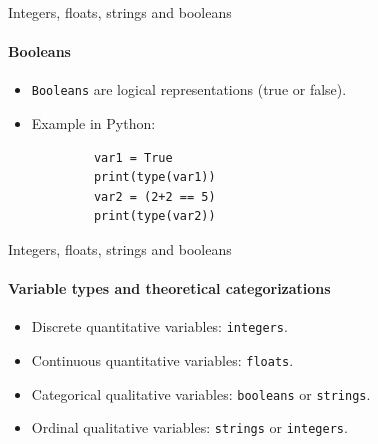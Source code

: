 \documentclass[notes,11pt, aspectratio=169, xcolor=table]{beamer}
\begin{document}
    \begin{frame}[fragile=singleslide]{Integers, floats, strings and booleans}
    \framesubtitle{Booleans}

        \begin{itemize}
            \item \texttt{Booleans} are logical representations (true or false).
            \item Example in Python:
        \end{itemize}

        \begin{verbatim}
            var1 = True
            print(type(var1))
            var2 = (2+2 == 5)
            print(type(var2))
        \end{verbatim}    
   
    \end{frame}    

    \begin{frame}[fragile=singleslide]{Integers, floats, strings and booleans}
    \framesubtitle{Variable types and theoretical categorizations}

        \begin{itemize}
            \item Discrete quantitative variables: \texttt{integers}.
            \item Continuous quantitative variables: \texttt{floats}.
            \item Categorical qualitative variables: \texttt{booleans} or \texttt{strings}.
            \item Ordinal qualitative variables: \texttt{strings} or \texttt{integers}.
        \end{itemize}
    \end{frame}    
    
\end{document}
